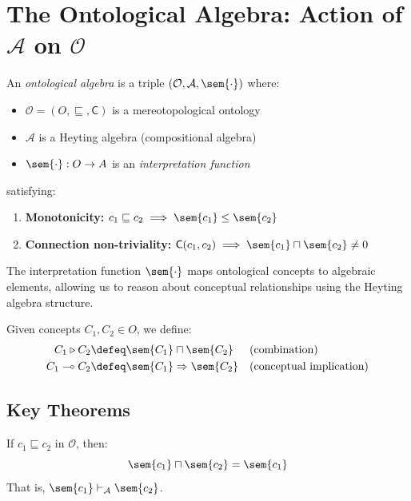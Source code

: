 \documentclass{itt-lean}
\begin{document}
\section{The Ontological Algebra: Action of $\mathcal{A}$ on $\mathcal{O}$}

\begin{definicao}
	An \emph{ontological algebra} is a triple $(\mathcal{O}, \mathcal{A}, \sem{\cdot})$ where:
	\begin{itemize}
		\item $\mathcal{O} = (O, \sqsubseteq, \mathsf{C})$ is a mereotopological ontology
		\item $\mathcal{A}$ is a Heyting algebra (compositional algebra)
		\item $\sem{\cdot} : O \to A$ is an \emph{interpretation function}
	\end{itemize}
	satisfying:
	\begin{enumerate}
		\item \textbf{Monotonicity:} $c_1 \sqsubseteq c_2 \implies \sem{c_1} \leq \sem{c_2}$
		\item \textbf{Connection non-triviality:} $\mathsf{C}(c_1, c_2) \implies \sem{c_1} \sqcap \sem{c_2} \neq 0$
	\end{enumerate}
\end{definicao}

The interpretation function $\sem{\cdot}$ maps ontological concepts to algebraic elements, allowing us to reason about conceptual relationships using the Heyting algebra structure.

\begin{definicao}
	Given concepts $C_1, C_2 \in O$, we define:
	\begin{align*}
		C_1 \triangleright C_2 &\defeq \sem{C_1} \sqcap \sem{C_2} && \text{(combination)} \\
		C_1 \multimap C_2 &\defeq \sem{C_1} \Rightarrow \sem{C_2} && \text{(conceptual implication)}
	\end{align*}
\end{definicao}

\subsection{Key Theorems}

\begin{teorema}
	If $c_1 \sqsubseteq c_2$ in $\mathcal{O}$, then:
	$$
	\sem{c_1} \sqcap \sem{c_2} = \sem{c_1}
	$$
	That is, $\sem{c_1} \vdash_{\mathcal{A}} \sem{c_2}$.
\end{teorema}
\end{document}
